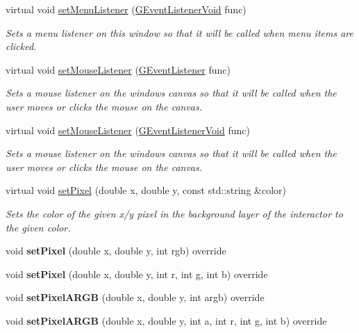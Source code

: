 \begin{DoxyCompactItemize}
virtual void \mbox{\hyperlink{classsgl_1_1GWindow_a1294d48e67c30207da71c3e3ab56abde}{set\+Menu\+Listener}} (\mbox{\hyperlink{namespacesgl_a54427ce97bb1c2804e4fe2b0a62e8b17}{G\+Event\+Listener\+Void}} func)
\begin{DoxyCompactList}\small\item\em Sets a menu listener on this window so that it will be called when menu items are clicked. \end{DoxyCompactList}\item 
virtual void \mbox{\hyperlink{classsgl_1_1GWindow_a37d8dbc943f59920f705b0104f60bde2}{set\+Mouse\+Listener}} (\mbox{\hyperlink{namespacesgl_ae9f3e9eab70035da1a2b114e21357b25}{G\+Event\+Listener}} func)
\begin{DoxyCompactList}\small\item\em Sets a mouse listener on the window\textquotesingle{}s canvas so that it will be called when the user moves or clicks the mouse on the canvas. \end{DoxyCompactList}\item 
virtual void \mbox{\hyperlink{classsgl_1_1GWindow_aea7f647ea62d59f71b5fad6aa65eeaf9}{set\+Mouse\+Listener}} (\mbox{\hyperlink{namespacesgl_a54427ce97bb1c2804e4fe2b0a62e8b17}{G\+Event\+Listener\+Void}} func)
\begin{DoxyCompactList}\small\item\em Sets a mouse listener on the window\textquotesingle{}s canvas so that it will be called when the user moves or clicks the mouse on the canvas. \end{DoxyCompactList}\item 
virtual void \mbox{\hyperlink{classsgl_1_1GDrawingSurface_a09f9640e4ff7388dcfc391efd88d2415}{set\+Pixel}} (double x, double y, const std\+::string \&color)
\begin{DoxyCompactList}\small\item\em Sets the color of the given x/y pixel in the background layer of the interactor to the given color. \end{DoxyCompactList}\item 
void {\bfseries set\+Pixel} (double x, double y, int rgb) override
\item 
void {\bfseries set\+Pixel} (double x, double y, int r, int g, int b) override
\item 
void {\bfseries set\+Pixel\+A\+R\+GB} (double x, double y, int argb) override
\item 
void {\bfseries set\+Pixel\+A\+R\+GB} (double x, double y, int a, int r, int g, int b) override

\end{DoxyCompactItemize}
